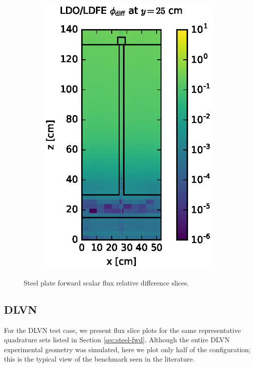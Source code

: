 \begin{figure}[!htb]
\begin{subfigure}{0.4\textwidth}
\includegraphics[max height=0.445\textheight]
{img/steel-plots/fwd/flux-diff-rel-ldfe01.eps}
\end{subfigure}
\caption{Steel plate forward scalar flux relative difference slices.}
\label{steel-fwd-diff-rel}
\end{figure}

\FloatBarrier
\subsection{DLVN}

For the DLVN test case, we present flux slice plots for the same representative
quadrature sets listed in Section \ref{sec:steel-fwd}. Although the entire DLVN
experimental geometry was simulated, here we plot only half of the configuration; this
is the typical view of the benchmark seen in the literature.

